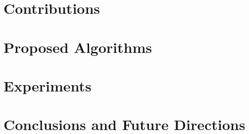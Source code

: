 \documentclass[letterpaper]{article} %
\begin{document}
\section{Contributions}


\section{Proposed Algorithms}


\section{Experiments}




\section{Conclusions and Future Directions}


\newpage


\end{document}
